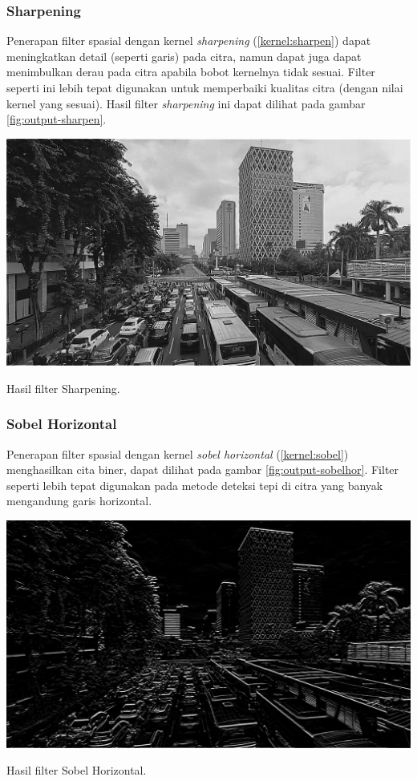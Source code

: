 \subsubsection{Sharpening}
Penerapan filter spasial dengan kernel \textit{sharpening} (\ref{kernel:sharpen}) dapat meningkatkan detail (seperti garis) pada citra, namun dapat juga dapat menimbulkan derau pada citra apabila bobot kernelnya tidak sesuai. Filter seperti ini lebih tepat digunakan untuk memperbaiki kualitas citra (dengan nilai kernel yang sesuai). Hasil filter \textit{sharpening} ini dapat dilihat pada gambar \ref{fig:output-sharpen}.
\begin{afigure}
    \includegraphics[width=0.8\linewidth, center]{images/output-image/input1-sharpen.png}
    \caption{Hasil filter Sharpening.}
    \label{fig:output-sharpen}
\end{afigure}

\subsubsection{Sobel Horizontal}
Penerapan filter spasial dengan kernel \textit{sobel horizontal} (\ref{kernel:sobel}) menghasilkan cita biner, dapat dilihat pada gambar \ref{fig:output-sobelhor}. Filter seperti lebih tepat digunakan pada metode deteksi tepi di citra yang banyak mengandung garis horizontal.
\begin{afigure}
    \includegraphics[width=0.8\linewidth, center]{images/output-image/input1-sobelhor.png}
    \caption{Hasil filter Sobel Horizontal.}
    \label{fig:output-sobelhor}
\end{afigure}


